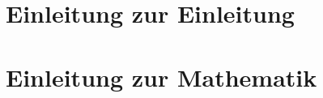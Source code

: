 \documentclass[twoside,bibliography=totoc,openany]{scrbook}
\begin{document}




\startcontents
\chapter{Einleitung zur Einleitung}
\thispagestyle{fancy}


\stopcontents


\startcontents
\chapter{Einleitung zur Mathematik}
\thispagestyle{fancy}


\stopcontents





\end{document}
